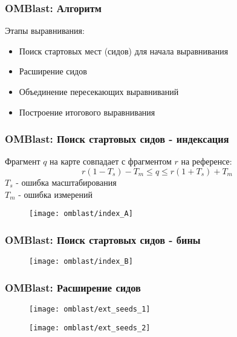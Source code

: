 

\begin{frame}
\frametitle{OMBlast: Алгоритм}

Этапы выравнивания:
\begin{itemize}
  \item Поиск стартовых мест (сидов) для начала выравнивания
  \item Расширение сидов
  \item Объединение пересекающих выравниваний
  \item Построение итогового выравнивания
\end{itemize}

\end{frame}

\begin{frame}
\frametitle{OMBlast: Поиск стартовых сидов - индексация}
  Фрагмент $q$ на карте совпадает с фрагментом $r$ на референсе:
  \begin{equation*}
    r(1 - T_s) - T_m \le q \le r(1 + T_s) + T_m
  \end{equation*}
  $T_s$ - ошибка масштабирования \\
  $T_m$ - ошибка измерений \\
  \begin{figure}
    \centering
    \texttt{[image: omblast/index\_A]}
  \end{figure}
\end{frame}

\begin{frame}
\frametitle{OMBlast: Поиск стартовых сидов - бины}
  \begin{figure}
    \centering
    \texttt{[image: omblast/index\_B]}
  \end{figure}
\end{frame}

\begin{frame}
\frametitle{OMBlast: Расширение сидов}
  \begin{figure}
    \centering
    \texttt{[image: omblast/ext\_seeds\_1]}
  \end{figure}
  \begin{figure}
    \centering
    \texttt{[image: omblast/ext\_seeds\_2]}
  \end{figure}
\end{frame}

